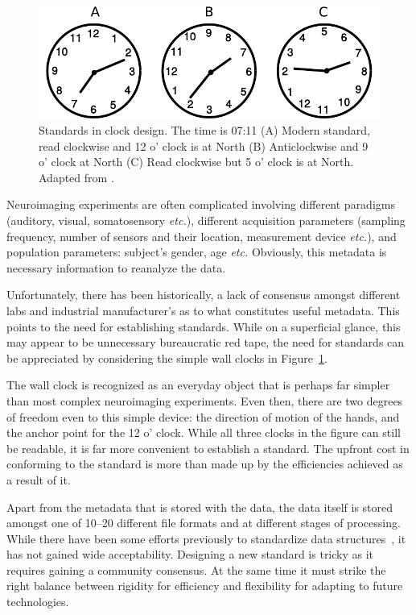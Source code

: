 \begin{figure}[htb]
\begin{center}
   \includegraphics[width=0.8\linewidth]{figures/clock.pdf}
\end{center}
   \caption[Standards in clocks]{Standards in clock design. The time is 07:11 (A) Modern standard, read clockwise and 12 o' clock is at North (B) Anticlockwise and 9 o' clock at North (C) Read clockwise but 5 o' clock is at North. Adapted from \cite{norman2013design}.}
   \label{fig:clock_standards}
\end{figure}
Neuroimaging experiments are often complicated involving different paradigms (auditory, visual, somatosensory \emph{etc.}), different acquisition parameters (sampling frequency, number of sensors and their location, measurement device \emph{etc.}), and population parameters: subject's gender, age \emph{etc.} Obviously, this metadata is necessary information to reanalyze the data.   

Unfortunately, there has been historically, a lack of consensus amongst different labs and industrial manufacturer's as to what constitutes useful metadata. This points to the need for establishing standards. While on a superficial glance, this may appear to be unnecessary bureaucratic red tape, the need for standards can be appreciated by considering the simple wall clocks in Figure~\ref{fig:clock_standards}.

The wall clock is recognized as an everyday object that is perhaps far simpler than most complex neuroimaging experiments. Even then, there are two degrees of freedom even to this simple device: the direction of motion of the hands, and the anchor point for the 12 o' clock. While all three clocks in the figure can still be readable, it is far more convenient to establish a standard. The upfront cost in conforming to the standard is more than made up by the efficiencies achieved as a result of it.

Apart from the metadata that is stored with the data, the data itself is stored amongst one of 10--20 different file formats and at different stages of processing. While there have been some efforts previously to standardize data structures~\citep{gibson2009minimum, grewe2011bottom, stoewer2013singlefile, teeters2015neurodata, bigdely2016preparing}, it has not gained wide acceptability. Designing a new standard is tricky as it requires gaining a community consensus. At the same time it must strike the right balance between rigidity for efficiency and flexibility for adapting to future technologies. 

